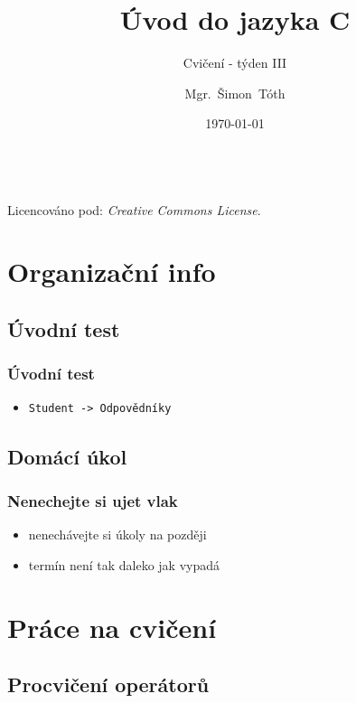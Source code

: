 

\title{Úvod do jazyka C}
\subtitle{Cvičení - týden III}
\author[]{Mgr.~Šimon~Tóth}
\date{\today}

\newcommand{\CcNote}[1]{%
        Licencováno pod: \textit{Creative Commons #1 3.0 License}.%
}


	\begin{frame}
		\titlepage
		\vfill
		\begin{center}
			\\
			{\tiny\CcNote{\CcLongnameByNcSa}}
			\vspace*{2ex}
		\end{center}
	\end{frame}

\section{Organizační info}
\subsection{Úvodní test}

\begin{frame}
	\frametitle{Úvodní test}
	\begin{itemize}
		\item{\texttt{Student -> Odpovědníky}}
	\end{itemize}
\end{frame}

\subsection{Domácí úkol}

\begin{frame}
	\frametitle{Nenechejte si ujet vlak}
	\begin{itemize}
		\item{nenechávejte si úkoly na později}
		\item{termín není tak daleko jak vypadá}
	\end{itemize}
\end{frame}

\section{Práce na cvičení}
\subsection{Procvičení operátorů}

